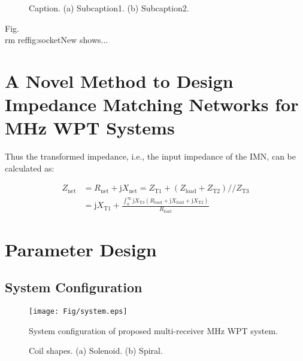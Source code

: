 \documentclass[conference]{IEEEtran}
\begin{document}
\begin{figure}[!h]
	\centering
	\hspace{0 pt}
	\caption{Caption. (a) Subcaption1. (b) Subcaption2.}
	\label{fig:socketNew}
\end{figure}

Fig.~\\rm ref{fig:socketNew} shows...
 
\section{A Novel Method to Design Impedance Matching Networks for MHz WPT Systems}
\label{novel}
Thus the transformed impedance, i.e., the input impedance of the IMN, can be calculated as: 



\begin{equation}
\begin{split}
Z_{\mathrm{net}}&=R_{\mathrm{net}}+\mathrm{j}X_{\mathrm{net}}=Z_{\mathrm{T}1}+\left( Z_{\mathrm{load}}+Z_{\mathrm{T}2} \right) //Z_{\mathrm{T}3}
\\
&=\mathrm{j}X_{\mathrm{T}1}+\frac{\int_0^{\infty}{\mathrm{j}X_{\mathrm{T}3}\left( R_{\mathrm{load}}+\mathrm{j}X_{\mathrm{load}}+\mathrm{j}X_{\mathrm{T}2} \right)}}{R_{\mathrm{load}}}
\end{split}
\label{eq:Znet}
\end{equation}

\section{Parameter Design}
\label{par}
\subsection{System Configuration}
\begin{figure}[!h]
	\centering
	\texttt{[image: Fig/system.eps]}
	\caption{System configuration of proposed multi-receiver MHz WPT system.}
	\label{fig:system}
\end{figure}

\begin{figure*}[!h]
	\centering
	\hspace{10 pt}
	\caption{Coil shapes. (a) Solenoid. (b) Spiral.}
	\label{fig:coilshape}
\end{figure*}
\end{document}

